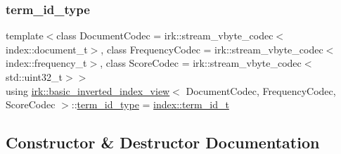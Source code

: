 \mbox{\label{classirk_1_1basic__inverted__index__view_a6b272abc76df208ce59bac93810e7331}} 
\subsubsection{\texorpdfstring{term\+\_\+id\+\_\+type}{term\_id\_type}}
{\footnotesize\ttfamily template$<$class Document\+Codec  = irk\+::stream\+\_\+vbyte\+\_\+codec$<$index\+::document\+\_\+t$>$, class Frequency\+Codec  = irk\+::stream\+\_\+vbyte\+\_\+codec$<$index\+::frequency\+\_\+t$>$, class Score\+Codec  = irk\+::stream\+\_\+vbyte\+\_\+codec$<$std\+::uint32\+\_\+t$>$$>$ \\
using \mbox{\hyperlink{classirk_1_1basic__inverted__index__view}{irk\+::basic\+\_\+inverted\+\_\+index\+\_\+view}}$<$ Document\+Codec, Frequency\+Codec, Score\+Codec $>$\+::\mbox{\hyperlink{classirk_1_1basic__inverted__index__view_a6b272abc76df208ce59bac93810e7331}{term\+\_\+id\+\_\+type}} =  \mbox{\hyperlink{namespaceirk_1_1index_ae2ce3a02969196fe6dab4443ed2007d5}{index\+::term\+\_\+id\+\_\+t}}}



\subsection{Constructor \& Destructor Documentation}
\mbox{\label{classirk_1_1basic__inverted__index__view_a8f30f4f42aae72ec340cf198557b0a25}} 
